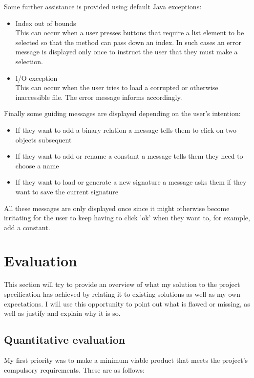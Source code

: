 \documentclass{report}
\begin{document}
\noindent Some further assistance is provided using default Java exceptions:
\begin{itemize}
\item Index out of bounds\\
This can occur when a user presses buttons that require a list element to be 
selected so that the method can pass down an index. In such cases an error 
message is displayed only once to instruct the user that they must make a 
selection.
\item I/O exception\\
This can occur when the user tries to load a corrupted or otherwise inaccessible 
file. The error message informs accordingly.
\end{itemize}

\noindent Finally some guiding messages are displayed depending on the user's 
intention:

\begin{itemize}
\item If they want to add a binary relation a message tells them to click on two 
objects subsequent
\item If they want to add or rename a constant a message tells them they need to 
choose a name
\item If they want to load or generate a new signature a message asks them if 
they want to save the current signature
\end{itemize}

\noindent All these messages are only displayed once since it might otherwise 
become irritating for the user to keep having to click 'ok' when they want to, 
for example, add a constant.


\chapter{Evaluation}
This section will try to provide an overview of what my solution to the project 
specification has achieved by relating it to existing solutions as well as my 
own expectations. I will use this opportunity to point out what is flawed or 
missing, as well as justify and explain why it is so.

\section{Quantitative evaluation}
My first priority was to make a minimum viable product that meets the project's 
compulsory requirements. These are as follows:
\end{document}
